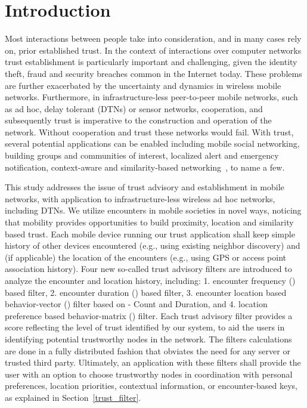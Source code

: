 \documentclass[10pt,conference]{IEEEtran}
\begin{document}
\section{Introduction}
Most interactions between people take into consideration, and in many cases rely on, prior established trust. In the context of interactions over computer networks trust establishment is particularly important and challenging, given the identity theft, fraud and security breaches common in the Internet today. These problems are further exacerbated by the uncertainty and dynamics in wireless mobile networks. Furthermore, in infrastructure-less peer-to-peer mobile networks, such as ad hoc, delay tolerant (DTNs) or sensor networks, cooperation, and subsequently trust is imperative to the construction and operation of the network. Without cooperation and trust these networks would fail. With trust, several potential applications can be enabled including mobile social networking, building groups and communities of interest, localized alert and emergency notification, context-aware and similarity-based networking~\cite{profilecast}, to name a few.

This study addresses the issue of trust advisory and establishment in mobile networks, with application to infrastructure-less wireless ad hoc networks, including DTNs. We utilize encounters in mobile societies in novel ways, noticing that mobility provides opportunities to build proximity, location and similarity based trust. Each mobile device running our trust application shall keep simple history of other devices encountered (e.g., using existing neighbor discovery) and (if applicable) the location of the encounters (e.g., using GPS or access point association history). Four new so-called trust advisory filters are introduced to analyze the encounter and location history, including: 1. encounter frequency () based filter, 2. encounter duration () based filter, 3. encounter location based behavior-vector ()  filter  based on - Count and  Duration, and 4. location preference based behavior-matrix () filter. Each trust advisory filter provides a score reflecting the level of trust identified by our system, to aid the users in identifying potential trustworthy nodes in the network. The filters calculations are done in a fully distributed fashion that obviates the need for any server or trusted third party. Ultimately, an application with these filters shall provide the user with an option to choose trustworthy nodes in coordination with personal preferences, location priorities, contextual information, or encounter-based keys, as explained in Section~\ref{trust_filter}.
\end{document}
